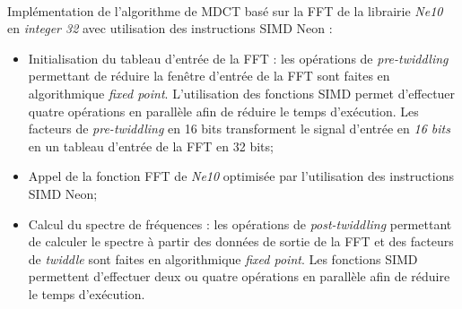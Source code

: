 \documentclass{article}
\begin{document}
\paragraph{}
Implémentation de l'algorithme de MDCT basé sur la FFT de la librairie \emph{Ne10} en \emph{integer 32} avec utilisation des instructions SIMD Neon :
\begin{itemize}
    \item Initialisation du tableau d'entrée de la FFT : les opérations de \emph{pre-twiddling} permettant de réduire la fenêtre d'entrée de la FFT sont faites en algorithmique \emph{fixed point}. L'utilisation des fonctions SIMD permet d'effectuer quatre opérations en parallèle afin de réduire le temps d'exécution. Les facteurs de \emph{pre-twiddling} en 16 bits transforment le signal d'entrée en \emph{16 bits} en un tableau d'entrée de la FFT en 32 bits;
    \item Appel de la fonction FFT de \emph{Ne10} optimisée par l'utilisation des instructions SIMD Neon;
    \item Calcul du spectre de fréquences : les opérations de \emph{post-twiddling} permettant de calculer le spectre à partir des données de sortie de la FFT et des facteurs de \emph{twiddle} sont faites en algorithmique \emph{fixed point}. Les fonctions SIMD permettent d'effectuer deux ou quatre opérations en parallèle afin de réduire le temps d'exécution.
\end{itemize}
\lstset{language=C++}
\newpage
\end{document}
